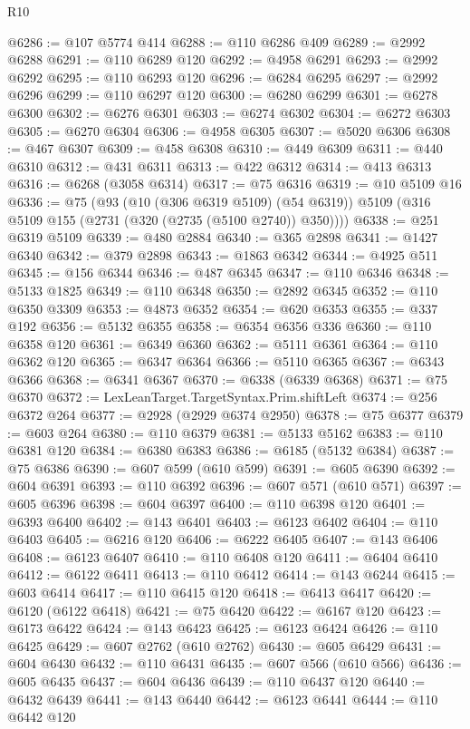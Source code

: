 \begin{lexlean}{R10}
\begin{coremodule}
{{{{{{{{{{{{{{{{{{{{{{{{{{{{{{{{{{{{{{{{{{{{{{{{{{{{{{{{{{{{{{{{{{{{{{{{{{{{{{{{{{{{@6286 := @107 @5774 @414
@6288 := @110 @6286 @409
@6289 := @2992 @6288
@6291 := @110 @6289 @120
@6292 := @4958 @6291
@6293 := @2992 @6292
@6295 := @110 @6293 @120
@6296 := @6284 @6295
@6297 := @2992 @6296
@6299 := @110 @6297 @120
@6300 := @6280 @6299
@6301 := @6278 @6300
@6302 := @6276 @6301
@6303 := @6274 @6302
@6304 := @6272 @6303
@6305 := @6270 @6304
@6306 := @4958 @6305
@6307 := @5020 @6306
@6308 := @467 @6307
@6309 := @458 @6308
@6310 := @449 @6309
@6311 := @440 @6310
@6312 := @431 @6311
@6313 := @422 @6312
@6314 := @413 @6313
@6316 := @6268 (@3058 @6314)
@6317 := @75 @6316
@6319 := @10 @5109 @16
@6336 := @75
    (@93
      (@10 (@306 @6319 @5109) (@54 @6319))
      @5109
      (@316 @5109 @155 (@2731 (@320 (@2735 (@5100 @2740)) @350))))
@6338 := @251 @6319 @5109
@6339 := @480 @2884
@6340 := @365 @2898
@6341 := @1427 @6340
@6342 := @379 @2898
@6343 := @1863 @6342
@6344 := @4925 @511
@6345 := @156 @6344
@6346 := @487 @6345
@6347 := @110 @6346
@6348 := @5133 @1825
@6349 := @110 @6348
@6350 := @2892 @6345
@6352 := @110 @6350 @3309
@6353 := @4873 @6352
@6354 := @620 @6353
@6355 := @337 @192
@6356 := @5132 @6355
@6358 := @6354 @6356 @336
@6360 := @110 @6358 @120
@6361 := @6349 @6360
@6362 := @5111 @6361
@6364 := @110 @6362 @120
@6365 := @6347 @6364
@6366 := @5110 @6365
@6367 := @6343 @6366
@6368 := @6341 @6367
@6370 := @6338 (@6339 @6368)
@6371 := @75 @6370
@6372 := LexLeanTarget.TargetSyntax.Prim.shiftLeft
@6374 := @256 @6372 @264
@6377 := @2928 (@2929 @6374 @2950)
@6378 := @75 @6377
@6379 := @603 @264
@6380 := @110 @6379
@6381 := @5133 @5162
@6383 := @110 @6381 @120
@6384 := @6380 @6383
@6386 := @6185 (@5132 @6384)
@6387 := @75 @6386
@6390 := @607 @599 (@610 @599)
@6391 := @605 @6390
@6392 := @604 @6391
@6393 := @110 @6392
@6396 := @607 @571 (@610 @571)
@6397 := @605 @6396
@6398 := @604 @6397
@6400 := @110 @6398 @120
@6401 := @6393 @6400
@6402 := @143 @6401
@6403 := @6123 @6402
@6404 := @110 @6403
@6405 := @6216 @120
@6406 := @6222 @6405
@6407 := @143 @6406
@6408 := @6123 @6407
@6410 := @110 @6408 @120
@6411 := @6404 @6410
@6412 := @6122 @6411
@6413 := @110 @6412
@6414 := @143 @6244
@6415 := @603 @6414
@6417 := @110 @6415 @120
@6418 := @6413 @6417
@6420 := @6120 (@6122 @6418)
@6421 := @75 @6420
@6422 := @6167 @120
@6423 := @6173 @6422
@6424 := @143 @6423
@6425 := @6123 @6424
@6426 := @110 @6425
@6429 := @607 @2762 (@610 @2762)
@6430 := @605 @6429
@6431 := @604 @6430
@6432 := @110 @6431
@6435 := @607 @566 (@610 @566)
@6436 := @605 @6435
@6437 := @604 @6436
@6439 := @110 @6437 @120
@6440 := @6432 @6439
@6441 := @143 @6440
@6442 := @6123 @6441
@6444 := @110 @6442 @120
}}}}}}}}}}}}}}}}}}}}}}}}}}}}}}}}}}}}}}}}}}}}}}}}}}}}}}}}}}}}}}}}}}}}}}}}}}}}}}}}}}}}
\end{coremodule}
\end{lexlean}
